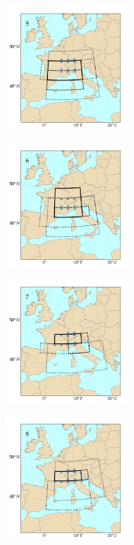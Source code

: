 \documentclass[twocol]{ametsoc}
\begin{document}
\begin{figure}[htb]
\begin{subfigure}{.5\columnwidth}
	\end{subfigure}
	\begin{subfigure}{.5\columnwidth}
		\centering
		\includegraphics[width=4.1cm]{figures/spatial_win_z4-hi2/Spatial_windows_5.png}
	\end{subfigure}%
	\begin{subfigure}{.5\columnwidth}
		\centering
		\includegraphics[width=4.1cm]{figures/spatial_win_z4-hi2/Spatial_windows_6.png}
	\end{subfigure}
	\begin{subfigure}{.5\columnwidth}
		\centering
		\includegraphics[width=4.1cm]{figures/spatial_win_z4-hi2/Spatial_windows_7.png}
	\end{subfigure}%
	\begin{subfigure}{.5\columnwidth}
		\centering
		\includegraphics[width=4.1cm]{figures/spatial_win_z4-hi2/Spatial_windows_8.png}

\end{subfigure}
\end{figure}
\end{document}
